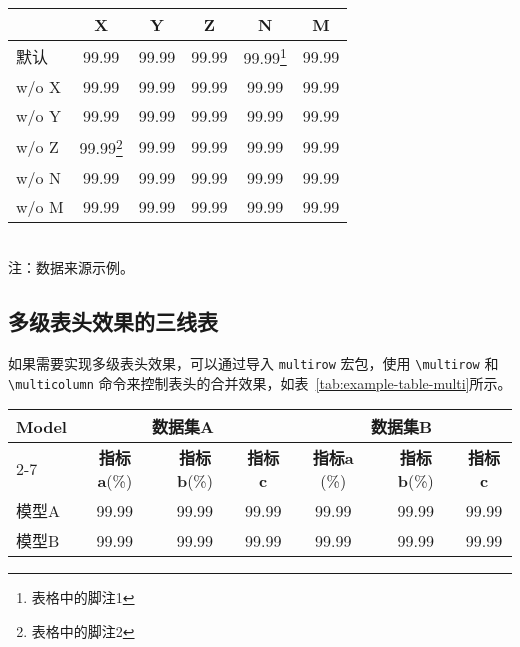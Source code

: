 \begin{table*}[htb]
    \centering
    \begin{minipage}[t]{0.55\linewidth} %
        \caption{带脚注的三线表。}
        \label{tab:example-table-footnote}
        \begin{small}
        \begin{tabular}{@{}lccccc@{}}
            \toprule[1.5pt]
            & \textbf{X} & \textbf{Y} & \textbf{Z} & \textbf{N} & \textbf{M} \\
            \midrule[1pt]
                默认        & 99.99 & 99.99 & 99.99 & 99.99\footnote{表格中的脚注1} & 99.99 \\
            \quad w/o X   & 99.99 & 99.99 & 99.99 & 99.99 & 99.99 \\
            \quad w/o Y   & 99.99 & 99.99 & 99.99 & 99.99 & 99.99 \\
            \quad w/o Z   & 99.99\footnote{表格中的脚注2} & 99.99 & 99.99 & 99.99 & 99.99 \\
            \quad w/o N   & 99.99 & 99.99 & 99.99 & 99.99 & 99.99 \\
            \quad w/o M   & 99.99 & 99.99 & 99.99 & 99.99 & 99.99 \\
            \bottomrule[1.5pt]
        \end{tabular}
        \end{small}
        \\[6pt] \footnotesize 注：数据来源示例。\\
    \end{minipage}
\end{table*}

\subsection{多级表头效果的三线表}
如果需要实现多级表头效果，可以通过导入 \verb|multirow| 宏包，使用 \verb|\multirow| 和 \verb|\multicolumn| 命令来控制表头的合并效果，如表~\ref{tab:example-table-multi}所示。
\begin{table*}[htbp]
    \centering
    \caption{多级表头效果的三线表。}
    \label{tab:example-table-multi}
    \begin{small}
    \begin{tabular}{@{}l|ccc|ccc@{}}
    \toprule
    \multirow{2}{*}{\textbf{Model}} & \multicolumn{3}{c|}{\textbf{数据集A}} & \multicolumn{3}{c}{\textbf{数据集B}} \\ \cmidrule(l){2-7} 
    & \textbf{指标a}(\%) & \textbf{指标b}(\%) & \textbf{指标c} & \textbf{指标a} (\%) & \textbf{指标b}(\%) & \textbf{指标c} \\ \midrule
        模型A      &99.99  & 99.99  & 99.99  &99.99  & 99.99  & 99.99  \\
        模型B      &99.99  & 99.99  & 99.99  &99.99  & 99.99  & 99.99  \\
    \bottomrule
    \end{tabular}
    \end{small}
\end{table*}

